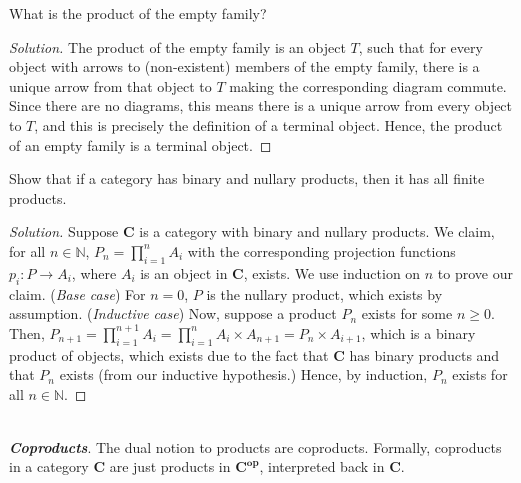 \documentclass[]{amsbook}
\newcommand{\catname}[1]{\mathbf{#1}}
\newcommand{\N}{\mathbb{N}}
\newcommand{\0}{\mathbf{0}}
\newcommand{\1}{\mathbf{1}}
\newenvironment{solution}
    {\begin{proof}[Solution]}{\end{proof}}
\begin{document}
\setcounter{Exercise}{28}
\begin{Exercise}
    What is the product of the empty family?
\end{Exercise}
\begin{solution}
    The product of the empty family is an object $T$, such that for every object
    with arrows to (non-existent) members of the empty family, there is a
    unique arrow from that object to $T$ making the corresponding diagram
    commute. Since there are no diagrams, this means there is a unique arrow
    from every object to $T$, and this is precisely the definition of a
    terminal object. Hence, the product of an empty family is a terminal object.
\end{solution}

\begin{Exercise}
    Show that if a category has binary and nullary products, then it has all
    finite products.
\end{Exercise}
\begin{solution}
    Suppose $\catname{C}$ is a category with binary and nullary products. We
    claim, for all $n \in \N$, $P_n = \prod_{i=1}^{n} A_i$ with the
    corresponding projection functions $p_i: P \to A_i$, where $A_i$ is an
    object in $\catname{C}$, exists. We use induction on $n$ to prove our
    claim. (\emph{Base case}) For $n = 0$, $P$ is the nullary product, which
    exists by assumption. (\emph{Inductive case}) Now, suppose a product
    $P_n$ exists for some $n \ge 0$. Then, $P_{n+1} = \prod_{i=1}^{n+1} A_i =
    \prod_{i=1}^{n} A_i \times A_{n+1} = P_n \times A_{i+1}$, which is a binary
    product of objects, which exists due to the fact that $\catname{C}$ has
    binary products and that $P_n$ exists (from our inductive hypothesis.)
    Hence, by induction, $P_n$ exists for all $n \in \N$.
\end{solution}
~\\
\emph{\textbf{Coproducts}}. The dual notion to products are coproducts.
Formally, coproducts in a category $\catname{C}$ are just products in
$\catname{C}^{\mathbf{op}}$, interpreted back in $\catname{C}$.
\end{document}

